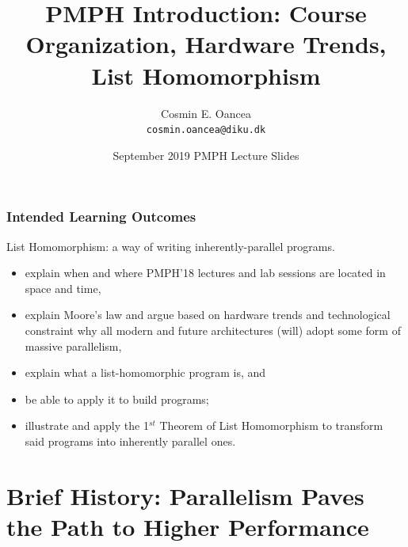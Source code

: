 \documentclass{beamer}
\title[Intro]{PMPH Introduction: Course Organization, Hardware Trends, List Homomorphism}
\author[C.~Oancea]{Cosmin E. Oancea\\{\tt cosmin.oancea@diku.dk}}
\institute{Department of Computer Science (DIKU)\\University of Copenhagen}
\date[Sept 2019]{September 2019 PMPH Lecture Slides}
\begin{document}
\titleslide




\begin{frame}[fragile,t]
\frametitle{Intended Learning Outcomes}

List Homomorphism: a way of writing inherently-parallel programs.
\bigskip

\begin{itemize}
    \item explain when and where PMPH'18 lectures and lab sessions 
            are located in space and time, \bigskip

    \item explain Moore's law and argue based on hardware trends 
            and technological constraint
            why all modern and future architectures (will)
            adopt some form of massive parallelism,\bigskip

    \item explain what a list-homomorphic program is, and 
    \item be able to apply it to build programs;
    \item illustrate and apply the 1$^{st}$ Theorem of List Homomorphism 
                to transform said programs into inherently parallel ones.
\end{itemize}
\end{frame}


\begin{frame}[fragile]
	\tableofcontents
\end{frame}

\section{Brief History: Parallelism Paves the Path to Higher Performance}
\end{document}
